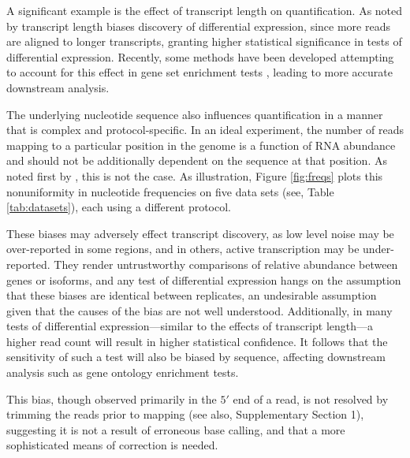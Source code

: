 \documentclass{bioinfo}
\begin{document}
A significant example is the effect of transcript length on quantification.  As
noted by \citet{Oshlack2009} transcript length biases discovery of
differential expression, since more reads are aligned to longer transcripts,
granting higher statistical significance in tests of differential expression.
Recently, some methods have been developed attempting to account for this effect
in gene set enrichment tests \citep{Young2010,Gao2011}, leading to more accurate
downstream analysis.

The underlying nucleotide sequence also influences quantification in a manner
that is complex and protocol-specific. In an ideal experiment, the number of
reads mapping to a particular position in the genome is a function of RNA
abundance and should not be additionally dependent on the sequence at that
position. As noted first by \citet{Dohm2008}, this is not the case.  As
illustration, Figure \ref{fig:freqs} plots this nonuniformity in nucleotide
frequencies on five data sets (see, Table \ref{tab:datasets}), each using a
different protocol.


These biases may adversely effect transcript discovery, as low level noise may
be over-reported in some regions, and in others, active transcription may be
under-reported. They render untrustworthy comparisons of relative abundance
between genes or isoforms, and any test of differential expression hangs on the
assumption that these biases are identical between replicates, an undesirable
assumption given that the causes of the bias are not well understood.
Additionally, in many tests of differential expression---similar to the effects
of transcript length---a higher read count will result in higher statistical
confidence. It follows that the sensitivity of such a test will also be biased
by sequence, affecting downstream analysis such as gene ontology enrichment
tests.

This bias, though observed primarily in the $5'$ end of a read, is not resolved by
trimming the reads prior to mapping \citep{Hansen2010} (see also, Supplementary
Section 1), suggesting it is not a result of erroneous base calling, and that a
more sophisticated means of correction is needed.
\end{document}
